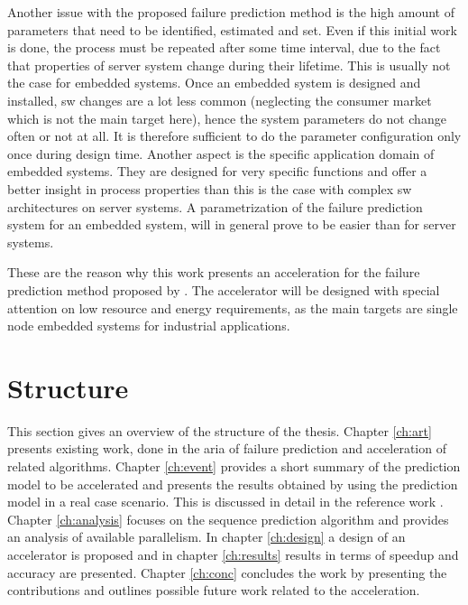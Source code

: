 \documentclass[mscthesis]{usiinfthesis}
\begin{document}
Another issue with the proposed failure prediction method is the high amount of
parameters that need to be identified, estimated and set. Even if this initial
work is done, the process must be repeated after some time interval, due to the
fact that properties of server system change during their lifetime. This is
usually not the case for embedded systems. Once an embedded system is designed
and installed, \gls{sw} changes are a lot less common (neglecting the consumer
market which is not the main target here), hence the system parameters do not
change often or not at all. It is therefore sufficient to do the parameter
configuration only once during design time. Another aspect is the specific
application domain of embedded systems. They are designed for very specific
functions and offer a better insight in process properties than this is the
case with complex \gls{sw} architectures on server systems. A parametrization
of the failure prediction system for an embedded system, will in general prove
to be easier than for server systems.

These are the reason why this work presents an acceleration for the failure
prediction method proposed by \cite{salfner08}. The accelerator will be designed
with special attention on low resource and energy requirements, as the main
targets are single node embedded systems for industrial applications.

\section{Structure}
\label{ch:intro_struct}

This section gives an overview of the structure of the thesis. Chapter
\ref{ch:art} presents existing work, done in the aria of failure prediction and
acceleration of related algorithms. Chapter \ref{ch:event} provides a short
summary of the prediction model to be accelerated and presents the results
obtained by using the prediction model in a real case scenario. This is
discussed in detail in the reference work \cite{salfner08}. Chapter
\ref{ch:analysis} focuses on the sequence prediction algorithm and provides an
analysis of available parallelism. In chapter \ref{ch:design} a design of an
accelerator is proposed and in chapter \ref{ch:results} results in terms of
speedup and accuracy are presented.  Chapter \ref{ch:conc} concludes the work
by presenting the contributions and outlines possible future work related to
the acceleration.
\end{document}
